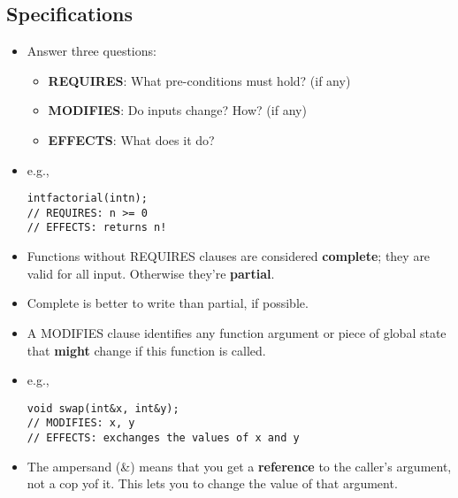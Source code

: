 \subsection{Specifications}
\begin{itemize}
	\item Answer three questions:
	\begin{itemize}
		\item \textbf{REQUIRES}: What pre-conditions must hold? (if any)
		\item \textbf{MODIFIES}: Do inputs change? How? (if any)
		\item \textbf{EFFECTS}: What does it do?
	\end{itemize}

	\item e.g.,
\begin{lstlisting}[style=C++]
intfactorial(intn);
// REQUIRES: n >= 0
// EFFECTS: returns n!
\end{lstlisting}

	\item Functions without REQUIRES clauses are considered \textbf{complete}; they are valid for all input. Otherwise they're \textbf{partial}.
	\item Complete is better to write than partial, if possible.
	\item A MODIFIES clause identifies any function argument or piece of global state that \textbf{might} change if this function is called.
	\item e.g.,
\begin{lstlisting}[style=C++]
void swap(int&x, int&y);
// MODIFIES: x, y
// EFFECTS: exchanges the values of x and y
\end{lstlisting}
	\item The ampersand (\&) means that you get a \textbf{reference} to the caller's argument, not a cop yof it. This lets you to change the value of that argument.
\end{itemize}

